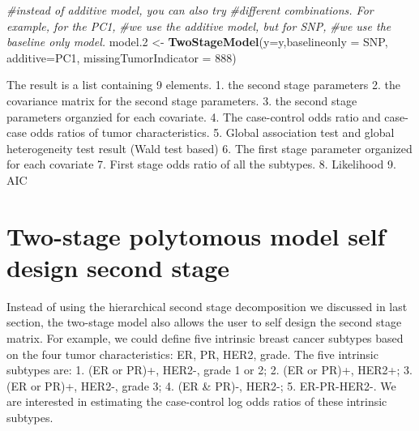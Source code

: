 \documentclass[11pt,]{article}
\newenvironment{Shaded}{\begin{snugshade}}{\end{snugshade}}
\newcommand{\KeywordTok}[1]{\textcolor[rgb]{0.13,0.29,0.53}{\textbf{#1}}}
\newcommand{\DataTypeTok}[1]{\textcolor[rgb]{0.13,0.29,0.53}{#1}}
\newcommand{\DecValTok}[1]{\textcolor[rgb]{0.00,0.00,0.81}{#1}}
\newcommand{\StringTok}[1]{\textcolor[rgb]{0.31,0.60,0.02}{#1}}
\newcommand{\CommentTok}[1]{\textcolor[rgb]{0.56,0.35,0.01}{\textit{#1}}}
\newcommand{\NormalTok}[1]{#1}
\begin{document}
\begin{Shaded}
\begin{Highlighting}[]
\CommentTok{#instead of additive model, you can also try }
\CommentTok{#different combinations. For example, for the PC1,}
\CommentTok{#we use the additive model, but for SNP,}
\CommentTok{#we use the baseline only model.}
\NormalTok{model.}\DecValTok{2}\NormalTok{ <-}\StringTok{ }\KeywordTok{TwoStageModel}\NormalTok{(}\DataTypeTok{y=}\NormalTok{y,}\DataTypeTok{baselineonly =}\NormalTok{ SNP,}
                         \DataTypeTok{additive=}\NormalTok{PC1,}
                         \DataTypeTok{missingTumorIndicator =} \DecValTok{888}\NormalTok{)}
\end{Highlighting}
\end{Shaded}

The result is a list containing 9 elements. 1. the second stage
parameters 2. the covariance matrix for the second stage parameters. 3.
the second stage parameters organzied for each covariate. 4. The
case-control odds ratio and case-case odds ratios of tumor
characteristics. 5. Global association test and global heterogeneity
test result (Wald test based) 6. The first stage parameter organized for
each covariate 7. First stage odds ratio of all the subtypes. 8.
Likelihood 9. AIC

\section{Two-stage polytomous model self design second
stage}\label{two-stage-polytomous-model-self-design-second-stage}

Instead of using the hierarchical second stage decomposition we
discussed in last section, the two-stage model also allows the user to
self design the second stage matrix. For example, we could define five
intrinsic breast cancer subtypes based on the four tumor
characteristics: ER, PR, HER2, grade. The five intrinsic subtypes are:
1. (ER or PR)+, HER2-, grade 1 or 2; 2. (ER or PR)+, HER2+; 3. (ER or
PR)+, HER2-, grade 3; 4. (ER \& PR)-, HER2-; 5. ER-PR-HER2-. We are
interested in estimating the case-control log odds ratios of these
intrinsic subtypes.
\end{document}
